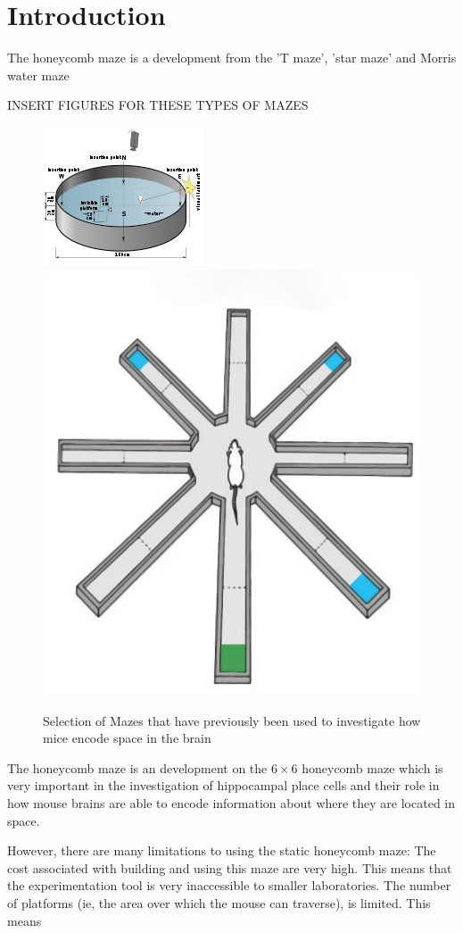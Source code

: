 \section{Introduction}

The honeycomb maze is a development from the 'T maze', 'star maze' and Morris water maze

INSERT FIGURES FOR THESE TYPES OF MAZES
\begin{figure}
    \centering
    \includegraphics[scale = 0.7]{images/morris_water_maze.png}
    \includegraphics[scale = 0.25]{images/radial_arm_maze.jpg}
    \caption{Selection of Mazes that have previously been used to investigate how mice encode space in the brain}
    \label{fig:previousmazes}
\end{figure}

The honeycomb maze is an development on the $6 \times 6$ honeycomb maze which is very important in the investigation of hippocampal place cells and their role in how mouse brains are able to encode information about where they are located in space. 

However, there are many limitations to using the static honeycomb maze: The cost associated with building and using this maze are very high. This means that the experimentation tool is very inaccessible to smaller  laboratories. The number of platforms (ie, the area over which the mouse can traverse), is limited. This means  
